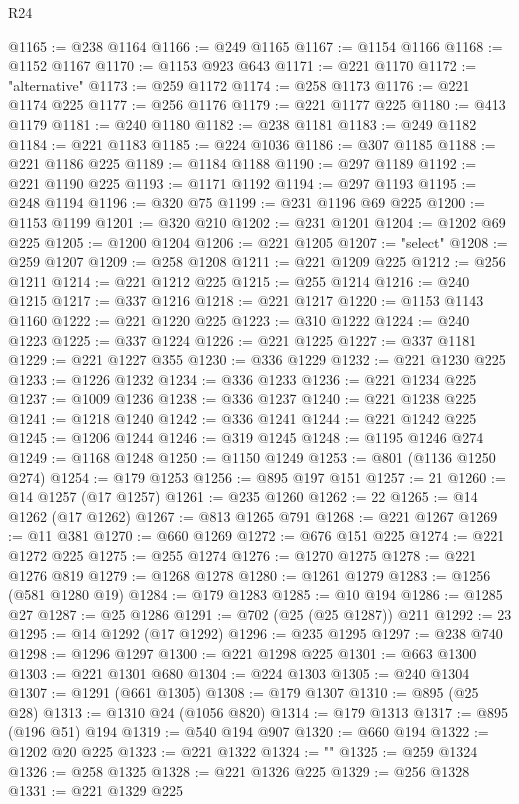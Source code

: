 \begin{lexlean}{R24}
\begin{coremodule}
@1165 := @238 @1164
@1166 := @249 @1165
@1167 := @1154 @1166
@1168 := @1152 @1167
@1170 := @1153 @923 @643
@1171 := @221 @1170
@1172 := "alternative"
@1173 := @259 @1172
@1174 := @258 @1173
@1176 := @221 @1174 @225
@1177 := @256 @1176
@1179 := @221 @1177 @225
@1180 := @413 @1179
@1181 := @240 @1180
@1182 := @238 @1181
@1183 := @249 @1182
@1184 := @221 @1183
@1185 := @224 @1036
@1186 := @307 @1185
@1188 := @221 @1186 @225
@1189 := @1184 @1188
@1190 := @297 @1189
@1192 := @221 @1190 @225
@1193 := @1171 @1192
@1194 := @297 @1193
@1195 := @248 @1194
@1196 := @320 @75
@1199 := @231 @1196 @69 @225
@1200 := @1153 @1199
@1201 := @320 @210
@1202 := @231 @1201
@1204 := @1202 @69 @225
@1205 := @1200 @1204
@1206 := @221 @1205
@1207 := "select"
@1208 := @259 @1207
@1209 := @258 @1208
@1211 := @221 @1209 @225
@1212 := @256 @1211
@1214 := @221 @1212 @225
@1215 := @255 @1214
@1216 := @240 @1215
@1217 := @337 @1216
@1218 := @221 @1217
@1220 := @1153 @1143 @1160
@1222 := @221 @1220 @225
@1223 := @310 @1222
@1224 := @240 @1223
@1225 := @337 @1224
@1226 := @221 @1225
@1227 := @337 @1181
@1229 := @221 @1227 @355
@1230 := @336 @1229
@1232 := @221 @1230 @225
@1233 := @1226 @1232
@1234 := @336 @1233
@1236 := @221 @1234 @225
@1237 := @1009 @1236
@1238 := @336 @1237
@1240 := @221 @1238 @225
@1241 := @1218 @1240
@1242 := @336 @1241
@1244 := @221 @1242 @225
@1245 := @1206 @1244
@1246 := @319 @1245
@1248 := @1195 @1246 @274
@1249 := @1168 @1248
@1250 := @1150 @1249
@1253 := @801 (@1136 @1250 @274)
@1254 := @179 @1253
@1256 := @895 @197 @151
@1257 := 21
@1260 := @14 @1257 (@17 @1257)
@1261 := @235 @1260
@1262 := 22
@1265 := @14 @1262 (@17 @1262)
@1267 := @813 @1265 @791
@1268 := @221 @1267
@1269 := @11 @381
@1270 := @660 @1269
@1272 := @676 @151 @225
@1274 := @221 @1272 @225
@1275 := @255 @1274
@1276 := @1270 @1275
@1278 := @221 @1276 @819
@1279 := @1268 @1278
@1280 := @1261 @1279
@1283 := @1256 (@581 @1280 @19)
@1284 := @179 @1283
@1285 := @10 @194
@1286 := @1285 @27
@1287 := @25 @1286
@1291 := @702 (@25 (@25 @1287)) @211
@1292 := 23
@1295 := @14 @1292 (@17 @1292)
@1296 := @235 @1295
@1297 := @238 @740
@1298 := @1296 @1297
@1300 := @221 @1298 @225
@1301 := @663 @1300
@1303 := @221 @1301 @680
@1304 := @224 @1303
@1305 := @240 @1304
@1307 := @1291 (@661 @1305)
@1308 := @179 @1307
@1310 := @895 (@25 @28)
@1313 := @1310 @24 (@1056 @820)
@1314 := @179 @1313
@1317 := @895 (@196 @51) @194
@1319 := @540 @194 @907
@1320 := @660 @194
@1322 := @1202 @20 @225
@1323 := @221 @1322
@1324 := ""
@1325 := @259 @1324
@1326 := @258 @1325
@1328 := @221 @1326 @225
@1329 := @256 @1328
@1331 := @221 @1329 @225

\end{coremodule}
\end{lexlean}
